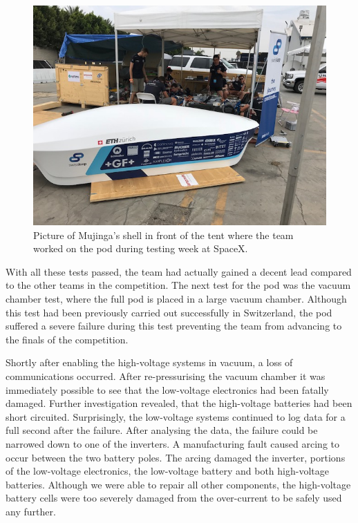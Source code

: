 \begin{figure}[H]
  \centering \includegraphics[width=1.0\textwidth]{./figures/mujinga_competition_tent}
  \caption{Picture of Mujinga's shell in front of the tent where the team worked on the pod during testing week at SpaceX.}
\end{figure}

With all these tests passed, the team had actually gained a decent lead compared to the other teams in the competition. The next test for the pod was the vacuum chamber test, where the full pod is placed in a large vacuum chamber. Although this test had been previously carried out successfully in Switzerland, the pod suffered a severe failure during this test preventing the team from advancing to the finals of the competition.

Shortly after enabling the high-voltage systems in vacuum, a loss of communications occurred. After re-pressurising the vacuum chamber it was immediately possible to see that the low-voltage electronics had been fatally damaged. Further investigation revealed, that the high-voltage batteries had been short circuited. Surprisingly, the low-voltage systems continued to log data for a full second after the failure. After analysing the data, the failure could be narrowed down to one of the inverters. A manufacturing fault caused arcing to occur between the two battery poles. The arcing damaged the inverter, portions of the low-voltage electronics, the low-voltage battery and both high-voltage batteries. Although we were able to repair all other components, the high-voltage battery cells were too severely damaged from the over-current to be safely used any further.

